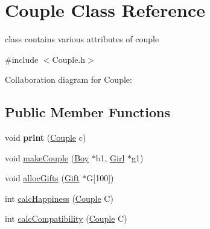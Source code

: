 \hypertarget{classCouple}{}\section{Couple Class Reference}
\label{classCouple}


class contains various attributes of couple  




{\ttfamily \#include $<$Couple.\+h$>$}



Collaboration diagram for Couple\+:
\subsection*{Public Member Functions}
\begin{DoxyCompactItemize}
\item 
void {\bfseries print} (\hyperlink{classCouple}{Couple} c)\hypertarget{classCouple_a4e70da8effdcd8cdbf83f42e8cf3aaef}{}\label{classCouple_a4e70da8effdcd8cdbf83f42e8cf3aaef}

\item 
void \hyperlink{classCouple_a292c25514d83de1c6ad489eb155864a6}{make\+Couple} (\hyperlink{classBoy}{Boy} $\ast$b1, \hyperlink{classGirl}{Girl} $\ast$g1)
\item 
void \hyperlink{classCouple_a71e0baa5a975a1c97e9e4310864b7049}{alloc\+Gifts} (\hyperlink{classGift}{Gift} $\ast$G\mbox{[}100\mbox{]})
\item 
int \hyperlink{classCouple_a5f4f7fc3e54d11fc15f11974291a2a51}{calc\+Happiness} (\hyperlink{classCouple}{Couple} C)
\item 
int \hyperlink{classCouple_aee0081cc8fdd0cf0bbe0aca7760bc429}{calc\+Compatibility} (\hyperlink{classCouple}{Couple} C)
\end{DoxyCompactItemize}

